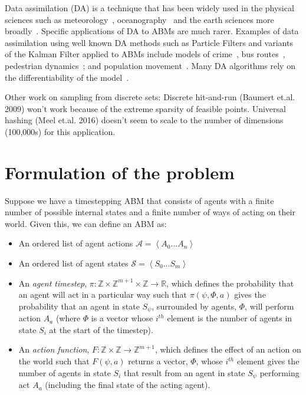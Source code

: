 \documentclass{article}
\begin{document}
Data assimilation (DA) is a technique that has been widely used in the physical sciences such as meteorology~\cite{kalnay_atmospheric_2003}, oceanography~\cite{bertino_sequential_2003} and the earth sciences more broadly~\cite{reichle_data_2008}. Specific applications of DA to ABMs are much rarer. Examples of data assimilation using well known DA methods such as Particle Filters and variants of the Kalman Filter applied to ABMs include models of crime~\cite{lloyd_exploring_2016}, bus routes~\cite{kieu_dealing_2020}, pedestrian dynamics~\cite{wang_data_2015, ward_dynamic_2016, clay_realtime_2020, malleson_simulating_2020};
and population movement~\cite{lueck_who_2019}. Many DA algorithms rely on the differentiability of the model~\cite{lewis_dynamic_2006}.

Other work on sampling from discrete sets: Discrete hit-and-run (Baumert et.al. 2009) won't work because of the extreme sparsity of feasible points. Universal hashing (Meel et.al. 2016) doesn't seem to scale to the number of dimensions (100,000s) for this application. 

\section{Formulation of the problem}


Suppose we have a timestepping ABM that consists of agents with a finite number of possible internal states and a finite number of ways of acting on their world. Given this, we can define an ABM as:
\begin{itemize}
	\item An ordered list of agent actions $\mathcal{A} =\left< A_0 ... A_n \right>$
	
	\item An ordered list of agent states $\mathcal{S} = \left<S_0 ... S_m\right>$
	
	\item An \textit{agent timestep}, $\pi : \mathbb{Z}\times\mathbb{Z}^{m+1}\times\mathbb{Z} \to \mathbb{R}$, which defines the probability that an agent will act in a particular way such that $\pi(\psi,\Phi,a)$ gives the probability that an agent in state $S_\psi$, surrounded by agents, $\Phi$, will perform action $A_a$ (where $\Phi$ is a vector whose $i^{th}$ element is the number of agents in state $S_i$ at the start of the timestep).
	
	\item An \textit{action function}, $F: \mathbb{Z} \times \mathbb{Z} \to \mathbb{Z}^{m+1}$, which defines the effect of an action on the world such that $F(\psi, a)$ returns a vector, $\Phi$, whose $i^{th}$ element gives the number of agents in state $S_i$ that result from an agent in state $S_\psi$ performing act $A_a$ (including the final state of the acting agent).
\end{itemize}
\end{document}
